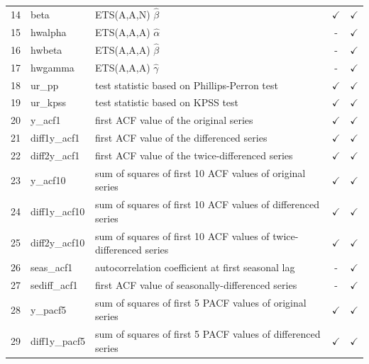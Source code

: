 \documentclass[11pt,a4paper,]{article}
\def\yes{$\checkmark$}
\theoremstyle{definition}
\theoremstyle{definition}
\theoremstyle{definition}
\theoremstyle{remark}
\begin{document}
\begin{table}[!htp]
\begin{tabular}{llp{}cc}
14 & beta           & ETS(A,A,N) $\hat\beta$                                                                  & \yes  & \yes\\
15 & hwalpha        & ETS(A,A,A) $\hat\alpha$                                                                 & -     & \yes \\
16 & hwbeta         & ETS(A,A,A) $\hat\beta$                                                                  & -     & \yes \\
17 & hwgamma        & ETS(A,A,A) $\hat\gamma$                                                                 & -     & \yes \\
18 & ur\_pp         & test statistic based on Phillips-Perron test                                            & \yes  & \yes \\
19 & ur\_kpss       & test statistic based on KPSS test                                                       & \yes  & \yes \\
20 & y\_acf1        & first ACF value of the original series                                                  & \yes  & \yes \\
21 & diff1y\_acf1   & first ACF value of the differenced series                                               & \yes  & \yes \\
22 & diff2y\_acf1   & first ACF value of the twice-differenced series                                         & \yes  & \yes \\
23 & y\_acf10        & sum of squares of first 10 ACF values of original series                                 & \yes  & \yes \\
24 & diff1y\_acf10   & sum of squares of first 10 ACF values of differenced series                              & \yes  & \yes \\
25 & diff2y\_acf10   & sum of squares of first 10 ACF values of twice-differenced series                        & \yes  & \yes \\
26 & seas\_acf1     & autocorrelation coefficient at first seasonal lag                                       & -     & \yes \\
27 & sediff\_acf1   & first ACF value of seasonally-differenced series                                        & -     & \yes\\
28 & y\_pacf5       & sum of squares of first 5 PACF values of original series                                & \yes  & \yes \\
29 & diff1y\_pacf5  & sum of squares of first 5 PACF values of differenced series                             & \yes  & \yes \\

\end{tabular}
\end{table}
\end{document}
